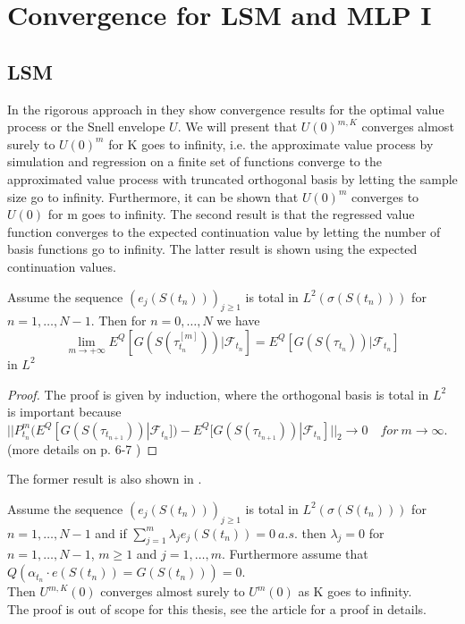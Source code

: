 \section{Convergence for LSM and MLP I}\label{Convergence}
\subsection{LSM}
In the rigorous approach in \parencite{analysisLSM} they show convergence results for the optimal value process or the Snell envelope $U$. We will present that $U(0)^{m,K}$ converges almost surely to $U(0)^{m}$ for K goes to infinity, i.e. the approximate value process by simulation and regression on a finite set of functions converge to the approximated value process with truncated orthogonal basis by letting the sample size go to infinity. Furthermore, it can be shown that $U(0)^{m}$ converges to $U(0)$ for m goes to infinity. The second result is that the regressed value function converges to the expected continuation value by letting the number of basis functions go to infinity. The latter result is shown using the expected continuation values.
\begin{theorem}\label{LSMConvergence1}
Assume the sequence $(e_{j}(S(t_n)))_{j\geq 1}$ is total in $L^2(\sigma(S(t_n)))$ for $n=1,\ldots,N-1$. Then for $n=0,\ldots,N$ we have
$$\lim_{m\to +\infty} E^Q[G(S(\tau_{t_n}^{[m]})) |\mathcal{F}_{t_n}]=E^Q[G(S(\tau_{t_n})) |\mathcal{F}_{t_n}]$$
in $L^2$
\begin{proof}
The proof is given by induction, where the orthogonal basis is total in $L^2$ is important because $||P^m_{t_n}(E^Q[G(S(\tau_{t_{n+1}}))|\mathcal{F}_{t_n}])- E^Q[G(S(\tau_{t_{n+1}}))|\mathcal{F}_{t_n}]||_2 \to 0 \quad for \ m \to \infty$.
(more details on p. 6-7 \parencite{analysisLSM})
\end{proof}
\end{theorem}

The former result is also shown in \parencite{analysisLSM}.
\begin{theorem}\label{LSMConvergence2}
Assume the sequence $(e_{j}(S(t_n)))_{j\geq 1}$ is total in $L^2(\sigma(S(t_n)))$ for $n=1,\ldots,N-1$ and if $\sum_{j=1}^{m} \lambda_j e_{j}(S(t_n))=0 \ a.s.$ then $\lambda_j=0$ for $n=1,\ldots,N-1$, $m\geq 1$ and $j=1,\ldots,m$. Furthermore assume that $Q(\alpha_{t_n} \cdot e(S(t_n))=G(S(t_n)))=0$.\\
Then $U^{m,K}(0)$ converges almost surely to $U^{m}(0)$ as K goes to infinity.\\
The proof is out of scope for this thesis, see the article \parencite{analysisLSM} for a proof in details. 
\end{theorem}

